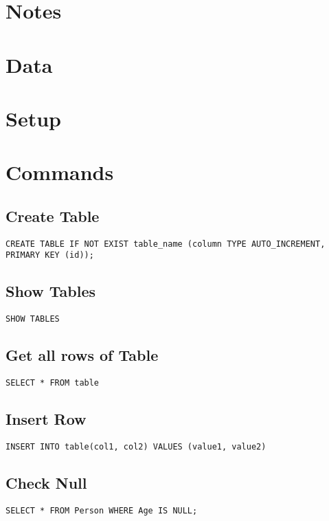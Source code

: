 \documentclass{article}
\title{\vspace{-2.25cm}{\small SQL}\vspace{-1.5cm}}
\date{}
\begin{document}
\maketitle
\begin{multicols}{3}
	
\section{Notes}
\section{Data}
\section{Setup}
\section{Commands}

\subsection{Create Table}
\lstinline|CREATE TABLE IF NOT EXIST table_name (column TYPE AUTO_INCREMENT, PRIMARY KEY (id));|

\subsection{Show Tables}
\lstinline|SHOW TABLES|

\subsection{Get all rows of Table}
\lstinline|SELECT * FROM table|

\subsection{Insert Row}
\lstinline|INSERT INTO table(col1, col2) VALUES (value1, value2)|

\subsection{Check Null}
\lstinline|SELECT * FROM Person WHERE Age IS NULL;|
\end{multicols}
\end{document}
